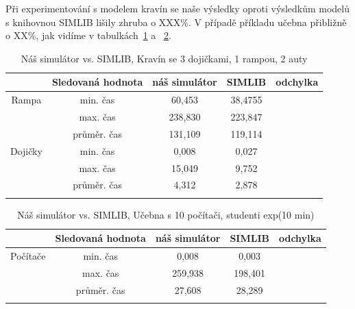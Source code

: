 \documentclass[12pt,a4paper,titlepage,final]{article}
\begin{document}
Při experimentování s modelem kravín se naše výsledky oproti výsledkům modelů s knihovnou SIMLIB lišily zhruba o XXX\%. V případě příkladu učebna přibližně o XX\%, jak vidíme v tabulkách~\ref{srovnani} a ~\ref{srovnani2}.


\begin{table}[ht]
\caption{Náš simulátor vs. SIMLIB, Kravín se 3 dojičkami, 1 rampou, 2 auty}
\centering
\begin{tabular}{c c c c c}
\hline\hline
& Sledovaná hodnota & náš simulátor & SIMLIB & odchylka\\[0.5ex]
\hline
Rampa & min. čas&  60,453 & 38,4755&\\
 & max. čas & 238,830 & 223,847&\\
 & průměr. čas & 131,109 & 119,114&\\
Dojičky & min. čas & 0,008 & 0,027&\\
 & max. čas & 15,049 & 9,752&\\
 & průměr. čas & 4,312 & 2,878&\\[1ex]
\hline
\label{srovnani}
\end{tabular}
\end{table}

\begin{table}[ht]
\caption{Náš simulátor vs. SIMLIB, Učebna s 10 počítači, studenti exp(10 min)}
\centering
\begin{tabular}{c c c c c}
\hline\hline
& Sledovaná hodnota & náš simulátor & SIMLIB & odchylka\\[0.5ex]
\hline
Počítače & min. čas&  0,008 & 0,003&\\
 & max. čas & 259,938 & 198,401&\\
 & průměr. čas & 27,608 & 28,289&\\[1ex]
\hline
\label{srovnani2}
\end{tabular}
\end{table}

\newpage



\end{document}

